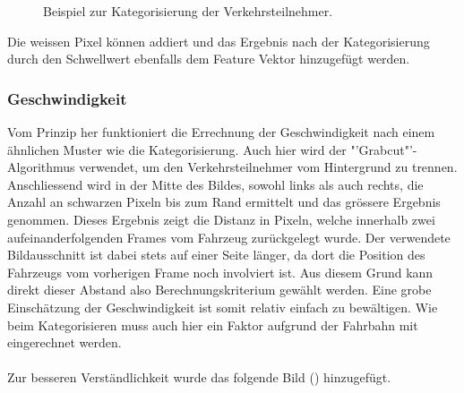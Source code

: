 {\begin{figure}[H]
  \centering
  \caption{Beispiel zur Kategorisierung der Verkehrsteilnehmer.}
  \label{bCategorize}
\end{figure}

Die weissen Pixel können addiert und das Ergebnis nach der Kategorisierung durch den Schwellwert ebenfalls dem Feature Vektor hinzugefügt werden. \cite{GrabCut, CountNonZero}

\subsubsection{Geschwindigkeit}
Vom Prinzip her funktioniert die Errechnung der Geschwindigkeit nach einem ähnlichen Muster wie die Kategorisierung. Auch hier wird der "'Grabcut"'-Algorithmus verwendet, um den Verkehrsteilnehmer vom Hintergrund zu trennen. Anschliessend wird in der Mitte des Bildes, sowohl links als auch rechts, die Anzahl an schwarzen Pixeln bis zum Rand ermittelt und das grössere Ergebnis genommen. Dieses Ergebnis zeigt die Distanz in Pixeln, welche innerhalb zwei aufeinanderfolgenden Frames vom Fahrzeug zurückgelegt wurde. Der verwendete Bildausschnitt ist dabei stets auf einer Seite länger, da dort die Position des Fahrzeugs vom vorherigen Frame noch involviert ist. Aus diesem Grund kann direkt dieser Abstand also Berechnungskriterium gewählt werden. Eine grobe Einschätzung der Geschwindigkeit ist somit relativ einfach zu bewältigen. Wie beim Kategorisieren muss auch hier ein Faktor aufgrund der Fahrbahn mit eingerechnet werden.\\\\
Zur besseren Verständlichkeit wurde das folgende Bild () hinzugefügt.

}
